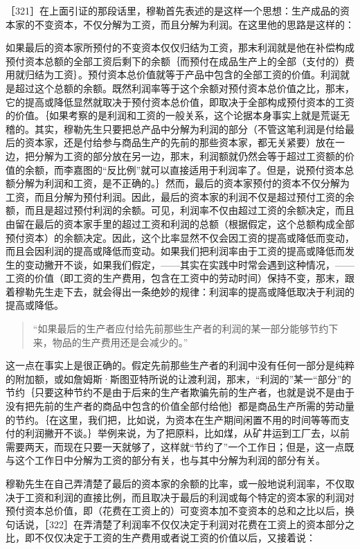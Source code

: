 ［321］在上面引证的那段话里，穆勒首先表述的是这样一个思想：生产成品的资本家的不变资本，不仅分解为工资，而且分解为利润。在这里他的思路是这样的：

如果最后的资本家所预付的不变资本仅仅归结为工资，那末利润就是他在补偿构成预付资本总额的全部工资后剩下的余额｛而预付在成品生产上的全部（支付的）费用就归结为工资｝。预付资本总价值就等于产品中包含的全部工资的价值。利润就是超过这个总额的余额。既然利润率等于这个余额对预付资本总价值之比，那末，它的提高或降低显然就取决于预付资本总价值，即取决于全部构成预付资本的工资的价值。｛如果考察的是利润和工资的一般关系，这个论据本身事实上就是荒诞无稽的。其实，穆勒先生只要把总产品中分解为利润的部分（不管这笔利润是付给最后的资本家，还是付给参与商品生产的先前的那些资本家，都无关紧要）放在一边，把分解为工资的部分放在另一边，那末，利润额就仍然会等于超过工资额的价值的余额，而李嘉图的“反比例”就可以直接适用于利润率了。但是，说预付资本总额分解为利润和工资，是不正确的。｝然而，最后的资本家预付的资本不仅分解为工资，而且分解为预付利润。因此，最后的资本家的利润不仅是超过预付工资的余额，而且是超过预付利润的余额。可见，利润率不仅由超过工资的余额决定，而且由留在最后的资本家手里的超过工资和利润的总额（根据假定，这个总额构成全部预付资本）的余额决定。因此，这个比率显然不仅会因工资的提高或降低而变动，而且会因利润的提高或降低而变动。如果我们把利润率由于工资的提高或降低而发生的变动撇开不谈，如果我们假定，——其实在实践中时常会遇到这种情况，——工资的价值（即工资的生产费用，包含在工资中的劳动时间）保持不变，那末，跟着穆勒先生走下去，就会得出一条绝妙的规律：利润率的提高或降低取决于利润的提高或降低。

\begin{quote}{“如果最后的生产者应付给先前那些生产者的利润的某一部分能够节约下来，物品的生产费用还是会减少的。”}\end{quote}

这一点在事实上是很正确的。假定先前那些生产者的利润中没有任何一部分是纯粹的附加额，或如詹姆斯·斯图亚特所说的让渡利润，那末，“利润的”某一“部分”的节约｛只要这种节约不是由于后来的生产者欺骗先前的生产者，也就是说不是由于没有把先前的生产者的商品中包含的价值全部付给他｝都是商品生产所需的劳动量的节约。｛在这里，我们把，比如说，为资本在生产期间闲置不用的时间等等而支付的利润撇开不谈。｝举例来说，为了把原料，比如煤，从矿井运到工厂去，以前需要两天，而现在只要一天就够了，这样就“节约了”一个工作日；但是，这一点既与这个工作日中分解为工资的部分有关，也与其中分解为利润的部分有关。

穆勒先生在自己弄清楚了最后的资本家的余额的比率，或一般地说利润率，不仅取决于工资和利润的直接比例，而且取决于最后的利润或每个特定的资本家的利润对预付资本总价值，即（花费在工资上的）可变资本加不变资本的总和之比以后，换句话说，［322］在弄清楚了利润率不仅仅决定于利润对花费在工资上的资本部分之比，即不仅仅决定于工资的生产费用或者说工资的价值以后，又接着说：

